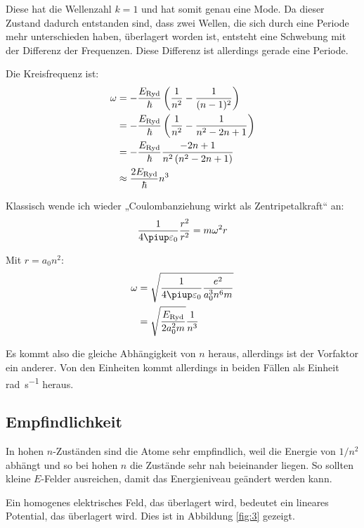 Diese hat die Wellenzahl $k = 1$ und hat somit genau eine Mode. Da dieser
Zustand dadurch entstanden sind, dass zwei Wellen, die sich durch eine Periode
mehr unterschieden haben, überlagert worden ist, entsteht eine Schwebung mit
der Differenz der Frequenzen. Diese Differenz ist allerdings gerade eine
Periode.

Die Kreisfrequenz ist:
\begin{align*}
	\omega
	&= - \frac{E_\text{Ryd}}\hbar \del{\frac1{n^2} - \frac1{(n-1)^2}} \\
	&= - \frac{E_\text{Ryd}}\hbar \del{\frac1{n^2} - \frac1{n^2 - 2n + 1}} \\
	&= - \frac{E_\text{Ryd}}\hbar \frac{-2n + 1}{n^2 \del{n^2 - 2n + 1}} \\
	&\approx \frac{2E_\text{Ryd}}\hbar {n^3}
\end{align*}

Klassisch wende ich wieder „Coulombanziehung wirkt als Zentripetalkraft“ an:
\[
	\frac{1}{4\piup \varepsilon_0} \frac{r^2}{r^2} = m \omega^2 r
\]

Mit $r = a_0 n^2$:
\begin{align*}
	\omega &= \sqrt{\frac{1}{4\piup \varepsilon_0} \frac{e^2}{a_0^3 n^6 m}} \\
					   &= \sqrt{\frac{E_\text{Ryd}}{2a_0^2m}} \frac{1}{n^3}
\end{align*}

Es kommt also die gleiche Abhängigkeit von $n$ heraus, allerdings ist der
Vorfaktor ein anderer. Von den Einheiten kommt allerdings in beiden Fällen
als Einheit \si{\radian\per\second} heraus.

\subsection{Empfindlichkeit}

In hohen $n$-Zuständen sind die Atome sehr empfindlich, weil die Energie von
$1/n^2$ abhängt und so bei hohen $n$ die Zustände sehr nah beieinander liegen.
So sollten kleine $E$-Felder ausreichen, damit das Energieniveau geändert
werden kann.

Ein homogenes elektrisches Feld, das überlagert wird, bedeutet ein lineares Potential, das überlagert wird. Dies ist in Abbildung \ref{fig:3} gezeigt.

